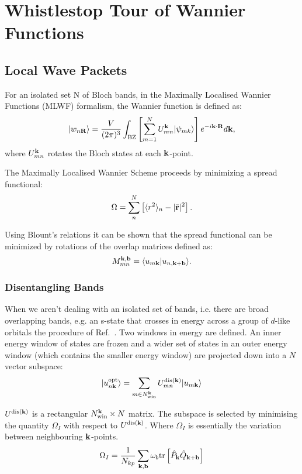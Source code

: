 \chapter{Whistlestop Tour of Wannier Functions}
\label{chap:wannier}
\section{Local Wave Packets}
For an isolated set N of Bloch bands, in the Maximally Localised Wannier Functions 
(MLWF) formalism, the Wannier function is defined as:
%
\begin{equation}
|w_{n{\bf R}}\rangle = \frac{V}{(2\pi)^{3}}\int_{\rm BZ} \left[ \sum_{m=1}^{N} U^{{\bf k}}_{mn}|\psi_{mk}\rangle \right]e^{-i{\bf k}\cdot{\bf R}}d{\bf k},
\end{equation}
%
where $U_{mn}^{{\bf k}}$ rotates the Bloch states at each ${\bf k}$-point.

The Maximally Localised Wannier Scheme proceeds by minimizing a spread functional:
%
\begin{equation}
\Omega = \sum_{n}^{N} \left[ \langle r^{2} \rangle_{n} - |\bar{{\bf r}}|^{2} \right].
\end{equation}
%

Using Blount's relations it can be shown that 
the spread functional can be minimized by rotations of the overlap matrices defined as: 
%
\begin{equation}
M_{mn}^{{\bf k},\bf{b}} = \langle u_{m{\bf k}}|u_{n,{\bf k}+\bf{b}} \rangle.
\end{equation}
%

\subsection{Disentangling Bands}
When we aren't dealing with an isolated set of bands, i.e.
there are broad overlapping bands, e.g. an s-state that crosses in energy
across a group of $d$-like orbitals the procedure of Ref.~\cite{souza02}.
Two windows in energy are defined. An inner energy window of states are frozen 
and a wider set of states in an outer energy window (which contains the smaller
energy window) are projected down into a $N$ vector subspace:
%
\begin{equation}
|u^{\rm opt}_{n{\bf k}}\rangle = \sum_{m \in N_{\rm win}^{{\bf k}}} U_{mn}^{{\rm dis}({\bf k})}|u_{m{\bf k}}\rangle
\end{equation}
%

$U^{{\rm dis}({\bf k})}$ is a rectangular $N_{\rm win}^{{\bf k}} \times N$ matrix. 
The subspace is selected by minimising the quantity $\Omega_{I}$ with respect to $U^{{\rm dis}({\bf k})}$.
Where $\Omega_{I}$ is essentially the variation between neighbouring ${\bf k}$-points. 
%
\begin{equation}
\Omega_{I} = \frac{1}{N_{kp}} \sum_{{\bf k}, \mathbf{b}} \omega_{b} {\rm tr} \left[\hat{P}_{{\bf k}}\hat{Q}_{{\bf k}+\mathbf{b}}\right]
\end{equation}

